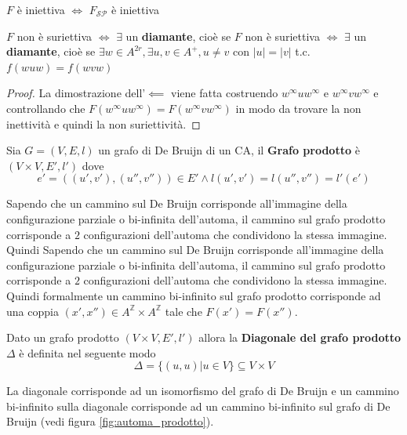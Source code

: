 \begin{teorema}
    $F$ è iniettiva $\iff$ $F_{\mathcal{SP}}$ è iniettiva
\end{teorema}

\begin{teorema}
    $F$ non è suriettiva $\iff$ $\exists$ un \textbf{diamante}, cioè se
    $F$ non è suriettiva $\iff$ $\exists$ un \textbf{diamante}, cioè se
    $\exists w \in A^{2r}, \exists u,v \in A^+, u\ne v$ con $|u|=|v|$ t.c. $f(wuw)=f(wvw)$
    \begin{proof}
        La dimostrazione dell'$\impliedby$ viene fatta costruendo $w^\infty u w^\infty$
        e $w^\infty v w^\infty$ e controllando che $F(w^\infty u w^\infty) = F(w^\infty v w^\infty)$
        in modo da trovare la non inettività e quindi la non suriettività.
    \end{proof}
\end{teorema}

\begin{definizione}
    Sia $G=(V,E,l)$ un grafo di De Bruijn di un CA, il \textbf{Grafo prodotto}
    è $(V\times V,E',l')$ dove $$e'=((u',v'), (u'',v''))\in E'\land l(u',v') = l(u'',v'') = l'(e')$$
\end{definizione}

Sapendo che un cammino sul De Bruijn corrisponde all'immagine della configurazione
parziale o bi-infinita dell'automa, il cammino sul grafo prodotto corrisponde
a $2$ configurazioni dell'automa che condividono la stessa immagine. Quindi
Sapendo che un cammino sul De Bruijn corrisponde all'immagine della configurazione
parziale o bi-infinita dell'automa, il cammino sul grafo prodotto corrisponde
a $2$ configurazioni dell'automa che condividono la stessa immagine. Quindi
formalmente un cammino bi-infinito sul grafo prodotto corrisponde ad una coppia
$(x',x'')\in A^\mathbb{Z} \times A^\mathbb{Z} $ tale che $F(x')=F(x'')$.

\begin{definizione}
    Dato un grafo prodotto $(V\times V,E',l')$ allora la \textbf{Diagonale del grafo prodotto}
    $\Delta$ è definita nel seguente modo
    $$\Delta = \{(u,u)| u \in V\}\subseteq V\times V$$
\end{definizione}
La diagonale corrisponde ad un isomorfismo del grafo di De Bruijn e un cammino
bi-infinito sulla diagonale corrisponde ad un cammino bi-infinito sul grafo di De
Bruijn (vedi figura \ref{fig:automa_prodotto}).

